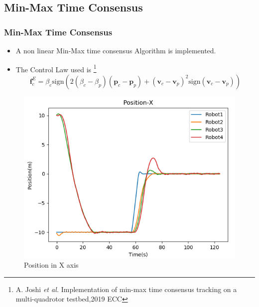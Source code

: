 \documentclass[10pt]{beamer}
\begin{document}
\subsection*{Min-Max Time Consensus}
\begin{frame}
	\frametitle{Min-Max Time Consensus}
	\begin{itemize}
		\item A non linear Min-Max time consensus Algorithm is implemented.
		\item The Control Law used is \footnote{A. Joshi\textit{ et al.} Implementation of min-max time consensus tracking on a multi-quadrotor testbed,2019 ECC}
		      \begin{equation*}
			      \mathbf{f}^E_c=\beta_c\text{sign}(2(\beta_c-\beta_p)(\mathbf{p}_c-\mathbf{p}_p)+(\mathbf{v}_c-\mathbf{v}_p)^2\text{sign}(\mathbf{v}_c-\mathbf{v}_p))
		      \end{equation*}
	\end{itemize}
	\pause
	\begin{minipage}{0.47\textwidth}
		\begin{figure}[h!]
			\centering
			\includegraphics[scale=0.27]{Position-X-minmax.png}
			\caption{Position in X axis}
			\label{Fig:pos_x_m}
		\end{figure}
	\end{minipage}
	\begin{minipage}{0.47\textwidth}
		\begin{figure}[h!]
			\centering

\end{figure}
\end{minipage}
\end{frame}
\end{document}
